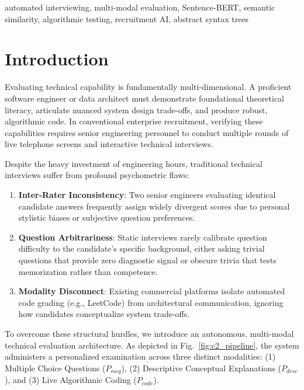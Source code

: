 \documentclass[conference]{IEEEtran}
\begin{document}
\begin{IEEEkeywords}
automated interviewing, multi-modal evaluation, Sentence-BERT, semantic similarity, algorithmic testing, recruitment AI, abstract syntax trees
\end{IEEEkeywords}

\section{Introduction}
Evaluating technical capability is fundamentally multi-dimensional. A proficient software engineer or data architect must demonstrate foundational theoretical literacy, articulate nuanced system design trade-offs, and produce robust, algorithmic code. In conventional enterprise recruitment, verifying these capabilities requires senior engineering personnel to conduct multiple rounds of live telephone screens and interactive technical interviews.

Despite the heavy investment of engineering hours, traditional technical interviews suffer from profound psychometric flaws:
\begin{enumerate}
    \item \textbf{Inter-Rater Inconsistency}: Two senior engineers evaluating identical candidate answers frequently assign widely divergent scores due to personal stylistic biases or subjective question preferences.
    \item \textbf{Question Arbitrariness}: Static interviews rarely calibrate question difficulty to the candidate's specific background, either asking trivial questions that provide zero diagnostic signal or obscure trivia that tests memorization rather than competence.
    \item \textbf{Modality Disconnect}: Existing commercial platforms isolate automated code grading (e.g., LeetCode) from architectural communication, ignoring how candidates conceptualize system trade-offs.
\end{enumerate}

To overcome these structural hurdles, we introduce an autonomous, multi-modal technical evaluation architecture. As depicted in Fig.~\ref{fig:c2_pipeline}, the system administers a personalized examination across three distinct modalities: (1) Multiple Choice Questions ($P_{mcq}$), (2) Descriptive Conceptual Explanations ($P_{desc}$), and (3) Live Algorithmic Coding ($P_{code}$).
\end{document}
